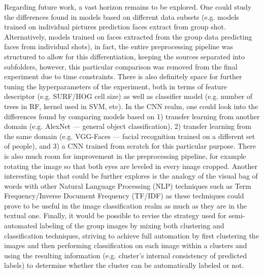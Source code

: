 \documentclass[11pt]{article}
\begin{document}
    Regarding future work, a vast horizon remains to be explored. One could study the differences found in models based on different data subsets (e.g. models trained on individual pictures prediction faces extract from group shot. Alternatively, models trained on faces extracted from the group data predicting faces from individual shots), in fact, the entire preprocessing pipeline was structured to allow for this differentiation, keeping the sources separated into subfolders, however, this particular comparison was removed from the final experiment due to time constraints. There is also definitely space for further tuning the hyperparameters of the experiment, both in terms of feature descriptor (e.g. SURF/HOG cell size) as well as classifier model (e.g. number of trees in RF, kernel used in SVM, etc). In the CNN realm, one could look into the differences found by comparing models based on 1) transfer learning from another domain (e.g. AlexNet --- general object classification), 2) transfer learning from the same domain (e.g. VGG-Faces --- facial recognition trained on a different set of people), and 3) a CNN trained from scratch for this particular purpose. There is also much room for improvement in the preprocessing pipeline, for example rotating the image so that both eyes are leveled in every image cropped. Another interesting topic that could be further explores is the analogy of the visual bag of words with other Natural Language Processing (NLP) techniques such as Term Frequency/Inverse Document Frequency (TF/IDF) as these techniques could prove to be useful in the image classification realm as much as they are in the textual one. Finally, it would be possible to revise the strategy used for semi-automated labeling of the group images by mixing both clustering and classification techniques, striving to achieve full automation by first clustering the images and then performing classification on each image within a clusters and using the resulting information (e.g. cluster's internal consistency of predicted labels) to determine whether the cluster can be automatically labeled or not.

    
    
\end{document}
